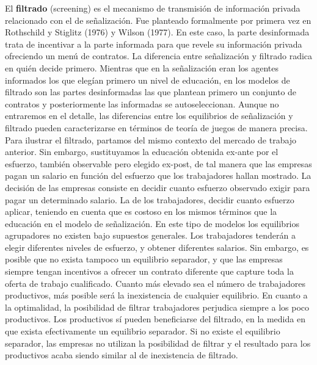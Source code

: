 \documentclass{nuevotema}
\begin{document}
El \textbf{filtrado} (screening) es el mecanismo de transmisión de información privada relacionado con el de señalización. Fue planteado formalmente por primera vez en Rothschild y Stiglitz (1976) y Wilson (1977). En este caso, la parte desinformada trata de incentivar a la parte informada para que revele su información privada ofreciendo un menú de contratos. La diferencia entre señalización y filtrado radica en quién decide primero. Mientras que en la señalización eran los agentes informados los que elegían primero un nivel de educación, en los modelos de filtrado son las partes desinformadas las que plantean primero un conjunto de contratos y posteriormente las informadas se autoseleccionan. Aunque no entraremos en el detalle, las diferencias entre los equilibrios de señalización y filtrado pueden caracterizarse en términos de teoría de juegos de manera precisa. Para ilustrar el filtrado, partamos del mismo contexto del mercado de trabajo anterior. Sin embargo, sustituyamos la educación obtenida ex-ante por el esfuerzo, también observable pero elegido ex-post, de tal manera que las empresas pagan un salario en función del esfuerzo que los trabajadores hallan mostrado. La decisión de las empresas consiste en decidir cuanto esfuerzo observado exigir para pagar un determinado salario. La de los trabajadores, decidir cuanto esfuerzo aplicar, teniendo en cuenta que es costoso en los mismos términos que la educación en el modelo de señalización. En este tipo de modelos los equilibrios agrupadores no existen bajo supuestos generales. Los trabajadores tenderán a elegir diferentes niveles de esfuerzo, y obtener diferentes salarios. Sin embargo, es posible que no exista tampoco un equilibrio separador, y que las empresas siempre tengan incentivos a ofrecer un contrato diferente que capture toda la oferta de trabajo cualificado. Cuanto más elevado sea el número de trabajadores productivos, más posible será la inexistencia de cualquier equilibrio. En cuanto a la optimalidad, la posibilidad de filtrar trabajadores perjudica siempre a los poco productivos. Los productivos sí pueden beneficiarse del filtrado, en la medida en que exista efectivamente un equilibrio separador. Si no existe el equilibrio separador, las empresas no utilizan la posibilidad de filtrar y el resultado para los productivos acaba siendo similar al de inexistencia de filtrado. 
\end{document}
